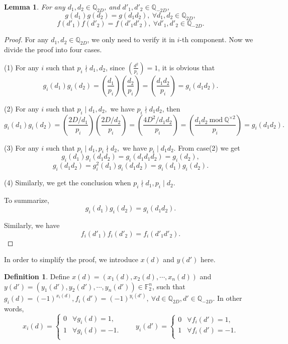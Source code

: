 \documentclass{amsart}
\numberwithin{equation}{section}
\theoremstyle{plain}
\newtheorem{lemma_}[equation]{Lemma}
\theoremstyle{definition}
\newtheorem{def_}[equation]{Definition}
\newcommand{\lemm}[1]{\begin{lemma_}#1\end{lemma_}}
\newcommand{\defi}[1]{\begin{def_}#1\end{def_}}
\newcommand{\pf}[1]{\begin{proof}#1\end{proof}}
\newcommand{\FF}{\mathbb F}
\newcommand{\QQ}{\mathbb Q}
\renewcommand{\mod}[1]{\ \mathrm{mod}\ #1}  %
\begin{document}
\lemm{\label{lemma_1} For any $d_1,d_2 \in \QQ_{2D}$, and $d'_1,d'_2 \in \QQ_{-2D}$,
$$g(d_1)g(d_2) = g(d_1d_2),\  \forall d_1,d_2 \in \mathbb{Q}_{2D},$$
$$f(d'_1)f(d'_2) = f(d'_1d'_2),\ \forall d'_1,d'_2 \in \mathbb{Q}_{-2D}.$$
}
\pf{For any $d_1,d_2 \in \mathbb{Q}_{2D}$, we only need to verify it in $i$-th component. Now we divide the proof into four cases.

(1) For any $i$ such that $p_i \nmid d_1, d_2$, since $(\frac{d^2}{p_i}) = 1$,
it is obvious that
 $$g_{i}(d_1)g_{i}(d_2) =(\frac{d_1}{p_i})(\frac{d_2}{p_i}) = (\frac{d_1d_2}{p_i}) = g_{i}(d_1d_2).$$

(2) For any $i$ such that $p_i \mid d_1, d_2,$ we have $p_i \nmid {d_1d_2}$, then
$$g_{i}(d_1)g_{i}(d_2) =(\frac{2D/d_1}{p_i})(\frac{2D/d_2}{p_i}) = (\frac{4D^2/d_1d_2}{p_i}) =(\frac{d_1d_2 \mod \QQ^{\times 2}}{p_i}) = g_{i}(d_1d_2).$$

(3) For any $i$ such that $p_i \mid d_1, p_i \nmid d_2,$ we have $p_i \mid {d_1d_2}$.
From case(2) we get
$$g_{i}(d_1)g_{i}(d_1d_2) = g_{i}(d_1d_1d_2) =  g_{i}(d_2),$$
$$g_{i}(d_1d_2) =g^{2}_{i}(d_1)g_{i}(d_1d_2) = g_{i}(d_1)g_{i}(d_2).$$

(4) Similarly, we get the conclusion when  $p_i \nmid d_1, p_i \mid d_2$.

To summarize,
$$g_{i}(d_1)g_{i}(d_2) = g_{i}(d_1d_2).$$

Similarly, we have
$$f_{i}(d'_1)f_{i}(d'_2) = f_{i}(d'_1d'_2) .$$
}
In order to simplify the proof, we introduce $x(d) $ and $ y(d')$ here.

\defi{
Define $x(d) = (x_{1}(d),x_{2}(d),\cdots,x_{n}(d))$ and $y(d') = (y_{1}(d'),y_{2}(d'),\cdots,y_{n}(d')) \in \FF_2^n$,  such that $g_{i}(d) = (-1)^{x_{i}(d)}, f_{i}(d') = (-1)^{y_{i}(d')}, \ \forall d \in \QQ_{2D}, d'\in \QQ_{-2D}$. In other words,
\begin{equation}\label{eq:array2}
x_{i}(d) =\left\{
\begin{array}{ll}
0       &\forall g_{i}(d)  = 1,\\
1      &\forall g_{i}(d) = -1.\\
\end{array}
\right.
\hspace{2em}
y_{i}(d') =\left\{\begin{array}{ll}
0       &\forall f_{i}(d')  = 1,\\
1      &\forall f_{i}(d') = -1.\\
\end{array}\right.
\end{equation}
}
\end{document}
